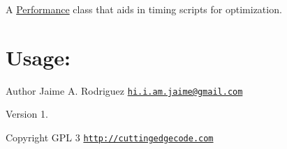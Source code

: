 A \hyperlink{class_performance}{Performance} class that aids in timing scripts for optimization.\hypertarget{nav1_usage}{}\section{Usage\-:}\label{nav1_usage}



\begin{DoxyAuthor}{Author}
Jaime A. Rodriguez \href{mailto:hi.i.am.jaime@gmail.com}{\tt hi.\-i.\-am.\-jaime@gmail.\-com} 
\end{DoxyAuthor}
\begin{DoxyVersion}{Version}
1. 
\end{DoxyVersion}
\begin{DoxyCopyright}{Copyright}
G\-P\-L 3 \href{http://cuttingedgecode.com}{\tt http\-://cuttingedgecode.\-com} 
\end{DoxyCopyright}
